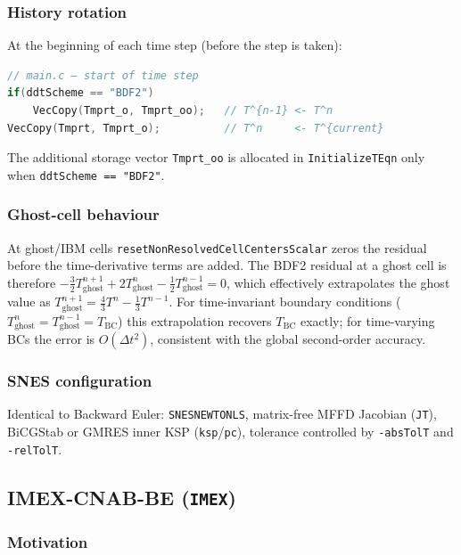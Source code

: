 \documentclass[12pt,a4paper]{article}
\begin{document}
\subsubsection*{History rotation}

At the beginning of each time step (before the step is taken):
\begin{lstlisting}[language=C,basicstyle=\ttfamily\small]
// main.c — start of time step
if(ddtScheme == "BDF2")
    VecCopy(Tmprt_o, Tmprt_oo);   // T^{n-1} <- T^n
VecCopy(Tmprt, Tmprt_o);          // T^n     <- T^{current}
\end{lstlisting}
\noindent
The additional storage vector \texttt{Tmprt\_oo} is allocated in
\texttt{InitializeTEqn} only when \texttt{ddtScheme == "BDF2"}.

\subsubsection*{Ghost-cell behaviour}

At ghost/IBM cells \texttt{resetNonResolvedCellCentersScalar} zeros the
residual before the time-derivative terms are added.  The BDF2
residual at a ghost cell is therefore
$-\tfrac{3}{2}T^{n+1}_{\text{ghost}} + 2T^n_{\text{ghost}} - \tfrac{1}{2}T^{n-1}_{\text{ghost}} = 0$,
which effectively extrapolates the ghost value as
$T^{n+1}_{\text{ghost}} = \tfrac{4}{3}T^n - \tfrac{1}{3}T^{n-1}$.
For time-invariant boundary conditions ($T^n_{\text{ghost}}=T^{n-1}_{\text{ghost}}=T_{\text{BC}}$)
this extrapolation recovers $T_{\text{BC}}$ exactly; for time-varying BCs the
error is $O(\Delta t^2)$, consistent with the global second-order accuracy.

\subsubsection*{SNES configuration}

Identical to Backward Euler: \texttt{SNESNEWTONLS}, matrix-free MFFD Jacobian
(\texttt{JT}), BiCGStab or GMRES inner KSP (\texttt{ksp}/\texttt{pc}),
tolerance controlled by \texttt{-absTolT} and \texttt{-relTolT}.

\subsection{IMEX-CNAB-BE (\texttt{IMEX})}
\label{ssec:teqn-imex}

\subsubsection*{Motivation}
\end{document}
